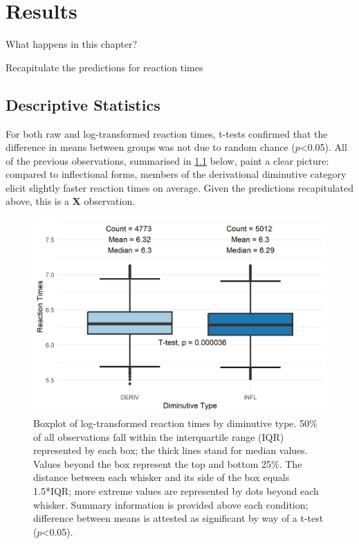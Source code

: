 \chapter{Results}\label{chp:results}

What happens in this chapter?

Recapitulate the predictions for reaction times
\section{Descriptive Statistics} \label{sec:desc_stats}

For both raw and log-transformed reaction times, t-tests confirmed that the difference in means between groups was not due to random chance ($p$<0.05). All of the previous observations, summarised in \ref{fig:boxplot} below, paint a clear picture: compared to inflectional forms, members of the derivational diminutive category elicit slightly faster reaction times on average. Given the predictions recapitulated above, this is a \textbf{X} observation.
\begin{figure}[ht]
    \centering
    \includegraphics[width=\textwidth]{images/dim_box.png}
    \caption[Boxplot of log-transformed reaction times by diminutive type]{Boxplot of log-transformed reaction times by diminutive type. 50\% of all observations fall within the interquartile range (IQR) represented by each box; the thick lines stand for median values. Values beyond the box represent the top and bottom 25\%. The distance between each whisker and its side of the box equals 1.5*IQR; more extreme values are represented by dots beyond each whisker. Summary information is provided above each condition; difference between means is attested as significant by way of a t-test ($p$<0.05).}
    \label{fig:boxplot}
\end{figure}

